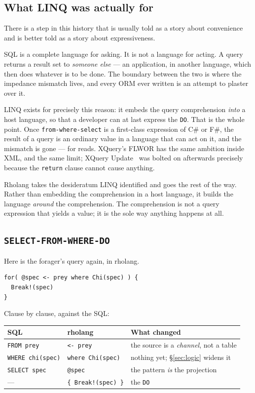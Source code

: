 \subsection{What LINQ was actually for}

There is a step in this history that is usually told as a story about
convenience and is better told as a story about expressiveness.

SQL is a complete language for asking. It is not a language for acting. A query
returns a result set to \emph{someone else} --- an application, in another
language, which then does whatever is to be done. The boundary between the two
is where the impedance mismatch lives, and every ORM ever written is an attempt
to plaster over it.

LINQ exists for precisely this reason: it embeds the query comprehension
\emph{into} a host language, so that a developer can at last express the
\texttt{DO}. That is the whole point. Once \texttt{from-where-select} is a
first-class expression of C\# or F\#, the result of a query is an ordinary value
in a language that can act on it, and the mismatch is gone --- for reads.
XQuery's FLWOR has the same ambition inside XML, and the same limit; XQuery
Update~\cite{XQueryUpdate} was bolted on afterwards precisely because the
\texttt{return} clause
cannot cause anything.

Rholang takes the desideratum LINQ identified and goes the rest of the way.
Rather than embedding the comprehension in a host language, it builds the
language \emph{around} the comprehension. The comprehension is not a query
expression that yields a value; it is the sole way anything happens at all.

\subsection{\texttt{SELECT-FROM-WHERE-DO}}

Here is the forager's query again, in rholang.

\begin{lstlisting}
for( @spec <- prey where Chi(spec) ) {
  Break!(spec)
}
\end{lstlisting}

Clause by clause, against the SQL:

\begin{center}
\small
\begin{tabular}{@{}lll@{}}
\toprule
\textbf{SQL} & \textbf{rholang} & \textbf{What changed} \\
\midrule
\texttt{FROM prey} & \texttt{<- prey} & the source is a \emph{channel}, not a table \\
\texttt{WHERE chi(spec)} & \texttt{where Chi(spec)} & nothing yet; \S\ref{sec:logic} widens it \\
\texttt{SELECT spec} & \texttt{@spec} & the pattern \emph{is} the projection \\
--- & \texttt{\{ Break!(spec) \}} & the \texttt{DO} \\
\bottomrule
\end{tabular}
\end{center}

